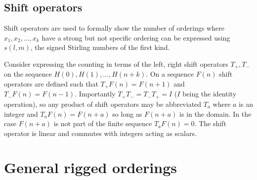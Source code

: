 \documentclass[12pt,reqno]{article}
\begin{document}
\subsection{Shift operators}

Shift operators are used to formally show the number of orderings where $x_{1}, x_{2}, \ldots, x_{k}$ have a strong but not specific ordering can be expressed using $s(l,m)$,  the signed Stirling numbers of the first kind. 

Consider expressing the counting in terms of the left, right shift operators $T_{+}, T_{-}$ on the sequence $H(0), H(1), \ldots, H(n + k)$. On a sequence $F(n)$ shift operators are defined such that $T_{+} F(n) = F(n + 1)$ and $T_{-}F(n) = F(n - 1)$. Importantly $T_{+}T_{-} = T_{-}T_{+} = I$ ($I$ being the identity operation), so any product of shift operators may be abbreviated $T_{a}$ where $a$ is an integer and $T_{a}F(n) = F(n + a)$ so long as $F(n + a)$ is in the domain. In the case $F(n + a)$ is not part of the finite sequence $T_{a}F(n) = 0$. The shift operator is linear and commutes with integers acting as scalars.

\section{General rigged orderings} \label{ls}
\end{document}

